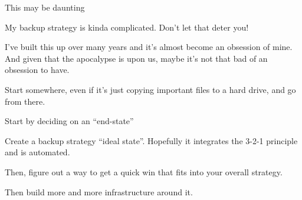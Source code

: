 \documentclass{lug}
\begin{document}
\begin{frame}{This may be daunting}

    My backup strategy is kinda complicated. Don't let that deter you!

    \pause
    I've built this up over many years and it's almost become an obsession of
    mine. \pause And given that the apocalypse is upon us, maybe it's not that
    bad of an obsession to have.

    \pause
    Start somewhere, even if it's just copying important files to a hard drive,
    and go from there.

\end{frame}

\begin{frame}{Start by deciding on an ``end-state''}

    Create a backup strategy ``ideal state''. \pause Hopefully it integrates the
    3-2-1 principle and is automated.

    \pause
    Then, figure out a way to get a quick win that fits into your overall
    strategy.

    \pause
    Then build more and more infrastructure around it.

\end{frame}
\end{document}

